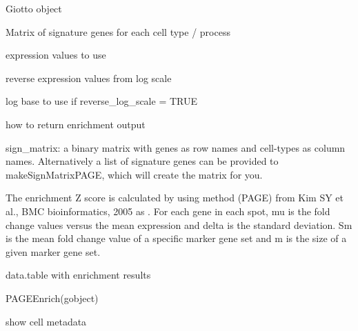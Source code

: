 \documentclass[a4paper]{book}
\begin{document}
%
\begin{Arguments}
\begin{ldescription}
\item[\code{gobject}] Giotto object

\item[\code{sign\_matrix}] Matrix of signature genes for each cell type / process

\item[\code{expression\_values}] expression values to use

\item[\code{reverse\_log\_scale}] reverse expression values from log scale

\item[\code{logbase}] log base to use if reverse\_log\_scale = TRUE

\item[\code{output\_enrichment}] how to return enrichment output
\end{ldescription}
\end{Arguments}
%
\begin{Details}\relax
sign\_matrix: a binary matrix with genes as row names and cell-types as column names.
Alternatively a list of signature genes can be provided to makeSignMatrixPAGE, which will create
the matrix for you. \\{}

The enrichment Z score is calculated by using method (PAGE) from
Kim SY et al., BMC bioinformatics, 2005 as .
For each gene in each spot, mu is the fold change values versus the mean expression
and delta is the standard deviation. Sm is the mean fold change value of a specific marker gene set
and  m is the size of a given marker gene set.
\end{Details}
%
\begin{Value}
data.table with enrichment results
\end{Value}
%
\begin{SeeAlso}\relax
{}
\end{SeeAlso}
%
\begin{Examples}
\begin{ExampleCode}
    PAGEEnrich(gobject)
\end{ExampleCode}
\end{Examples}
%
\begin{Description}\relax
show cell metadata
\end{Description}
\end{document}
